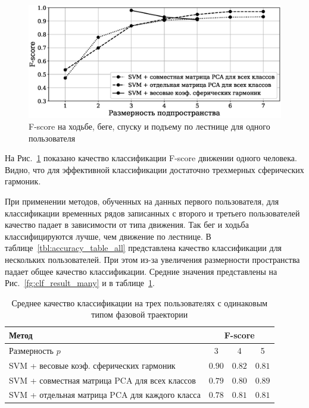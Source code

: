 \documentclass[article,14pt,subf,href,colorlinks=true
]{disser}
\begin{document}
\begin{figure}[H]
    \centering
    \captionsetup{justification=centering,margin=2cm}
    \includegraphics[scale=0.55]{./figs/result_first.eps}
    \caption{F-score на ходьбе, беге, спуску и подъему по лестнице для одного пользователя}
    \label{fg:clf_result_one}
\end{figure}

На Рис.~\ref{fg:clf_result_one} показано качество классификации F-score движении одного человека.
Видно, что для эффективной классификации достаточно трехмерных сферических гармоник.

При применении методов, обученных  на данных первого пользователя, для классификации временных рядов записанных с второго и третьего пользователей качество падает в зависимости от типа движения.
Так бег и ходьба классифицируются лучше, чем движение по лестнице.
В таблице~\ref{tbl:accuracy_table_all} представлена качество классификации для нескольких пользователей.
При этом из-за увеличения размерности пространства падает общее качество классификации.
Средние значения представлены на Рис.~\ref{fg:clf_result_many} и в таблице~\ref{tbl:accuracy_table_mean}.

\begin{table}[H]
    \caption{Среднее качество классификации на трех пользователях с одинаковым типом фазовой траектории}
    \label{tbl:accuracy_table_mean}
    \centering\medskip\tabcolsep=12pt\small
    \begin{tabular}{|l||ccc|}
        \hline
        Метод & \multicolumn{3}{c|}{F-score}\\
        \hline\hline
        Размерность $p$ & 3 & 4 & 5\\
        \hline
        {SVM + весовые коэф. сферических гармоник}     & $0.90$ & $0.82$ & $0.81$ \\
        \hline
        {SVM + совместная матрица PCA для всех классов} & $0.79$ & $0.80$ & $0.89$ \\
        \hline
        {SVM + отдельная матрица PCA для каждого класса} & $0.78$ & $0.81$ & $0.81$ \\
        \hline
    \end{tabular}
\end{table}
\end{document}
